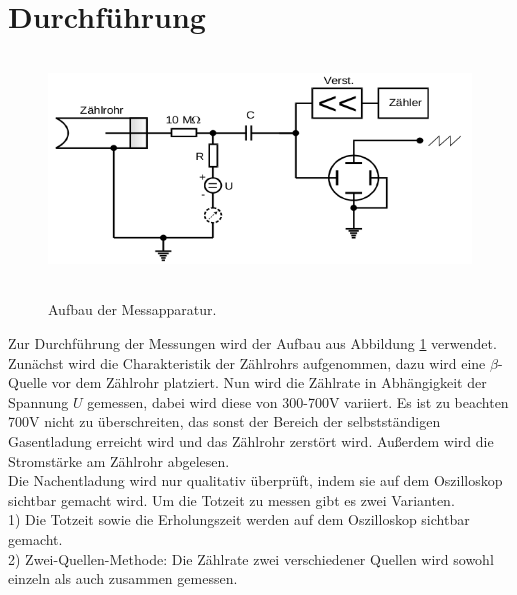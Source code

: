 \section{Durchführung}
\label{sec:Durchführung}

\begin{figure}[H]
  \centering
  \includegraphics[height=6cm]{aufbau.png}
  \caption{Aufbau der Messapparatur.}
  \cite{skript}
  \label{fig:aufbau}
\end{figure}
Zur Durchführung der Messungen wird der Aufbau aus Abbildung \ref{fig:aufbau}
verwendet. Zunächst wird die Charakteristik der Zählrohrs aufgenommen, dazu
wird eine $\beta$-Quelle vor dem Zählrohr platziert. Nun wird die
Zählrate in Abhängigkeit der Spannung $U$ gemessen, dabei wird diese
von 300-700\;V variiert. Es ist zu beachten 700\;V nicht zu überschreiten, das
sonst der Bereich der selbstständigen Gasentladung erreicht wird und das
Zählrohr zerstört wird. Außerdem wird die Stromstärke am Zählrohr abgelesen.\\
Die Nachentladung wird nur qualitativ überprüft, indem sie auf dem
Oszilloskop sichtbar gemacht wird.
Um die Totzeit zu messen gibt es zwei Varianten.\\
1) Die Totzeit sowie die Erholungszeit werden auf dem Oszilloskop sichtbar gemacht.\\
2) Zwei-Quellen-Methode: Die Zählrate zwei verschiedener Quellen wird
 sowohl einzeln als auch zusammen gemessen.
